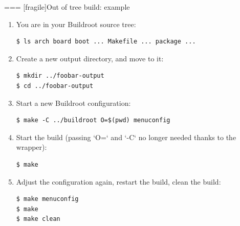 === [fragile]{Out of tree build: example}
  \small
  \begin{enumerate}
  \item You are in your Buildroot source tree:\\
{\tiny
\begin{block}{}
\begin{verbatim}
$ ls arch board boot ... Makefile ... package ...
\end{verbatim}
\end{block}
}
  \item Create a new output directory, and move to it:\\
{\tiny
\begin{block}{}
\begin{verbatim}
$ mkdir ../foobar-output
$ cd ../foobar-output
\end{verbatim}
\end{block}
}
  \item Start a new Buildroot configuration:\\
{\tiny
\begin{block}{}
\begin{verbatim}
$ make -C ../buildroot O=$(pwd) menuconfig
\end{verbatim}
\end{block}
}
  \item Start the build (passing `O=` and `-C` no longer needed thanks to the wrapper):\\
{\tiny
\begin{block}{}
\begin{verbatim}
$ make
\end{verbatim}
\end{block}
}
  \item Adjust the configuration again, restart the build, clean the build:\\
{\tiny
\begin{block}{}
\begin{verbatim}
$ make menuconfig
$ make
$ make clean
\end{verbatim}
\end{block}
}
  \end{enumerate}


